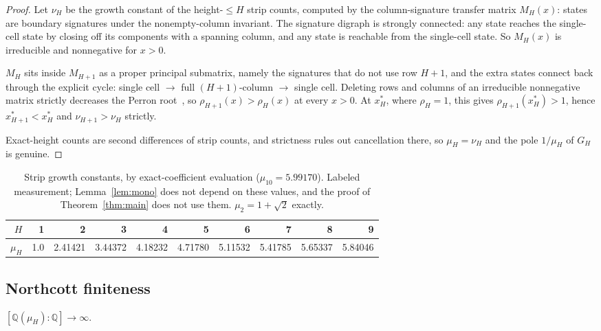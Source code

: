 \documentclass[11pt]{article}
\newcommand{\Q}{\mathbb{Q}}
\begin{document}
\begin{proof}
Let $\nu_H$ be the growth constant of the height-$\le H$ strip counts, computed
by the column-signature transfer matrix $M_H(x)$: states are boundary signatures
under the nonempty-column invariant. The signature digraph is strongly connected:
any state reaches the single-cell state by closing off its components with a
spanning column, and any state is reachable from the single-cell state. So
$M_H(x)$ is irreducible and nonnegative for $x > 0$.

$M_H$ sits inside $M_{H+1}$ as a proper principal submatrix, namely the
signatures that do not use row $H+1$, and the extra states connect back through
the explicit cycle: single cell $\to$ full $(H+1)$-column $\to$ single cell.
Deleting rows and columns of an irreducible nonnegative matrix strictly decreases
the Perron root~\cite[Ch.~8]{hornJohnson2013}, so $\rho_{H+1}(x) > \rho_H(x)$ at
every $x > 0$. At $x^*_H$, where $\rho_H = 1$, this gives
$\rho_{H+1}(x^*_H) > 1$, hence $x^*_{H+1} < x^*_H$ and $\nu_{H+1} > \nu_H$
strictly.

Exact-height counts are second differences of strip counts, and strictness rules
out cancellation there, so $\mu_H = \nu_H$ and the pole $1/\mu_H$ of $G_H$
is genuine.
\end{proof}

\begin{table}[H]
\centering\small
\begin{tabular}{r r r r r r r r r r}
\toprule
$H$ & 1 & 2 & 3 & 4 & 5 & 6 & 7 & 8 & 9 \\
\midrule
$\mu_H$ & 1.0 & 2.41421 & 3.44372 & 4.18232 & 4.71780 & 5.11532 & 5.41785 & 5.65337 & 5.84046 \\
\bottomrule
\end{tabular}
\caption{Strip growth constants, by exact-coefficient evaluation
($\mu_{10} = 5.99170$). Labeled measurement; Lemma~\ref{lem:mono} does not
depend on these values, and the proof of Theorem~\ref{thm:main} does not use
them. $\mu_2 = 1+\sqrt2$ exactly.}
\label{tab:mu}
\end{table}

\subsection{Northcott finiteness}

\begin{lemma}
\label{lem:northcott}
$[\Q(\mu_H):\Q] \to \infty$.
\end{lemma}
\end{document}
